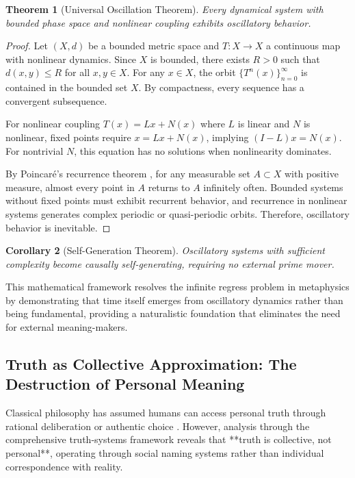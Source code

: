 \documentclass[12pt,a4paper]{article}
\newtheorem{theorem}{Theorem}[section]
\newtheorem{corollary}[theorem]{Corollary}
\begin{document}
\begin{theorem}[Universal Oscillation Theorem]
Every dynamical system with bounded phase space and nonlinear coupling exhibits oscillatory behavior.
\end{theorem}

\begin{proof}
Let $(X, d)$ be a bounded metric space and $T: X \to X$ a continuous map with nonlinear dynamics. Since $X$ is bounded, there exists $R > 0$ such that $d(x,y) \leq R$ for all $x,y \in X$. For any $x \in X$, the orbit $\{T^n(x)\}_{n=0}^{\infty}$ is contained in the bounded set $X$. By compactness, every sequence has a convergent subsequence.

For nonlinear coupling $T(x) = Lx + N(x)$ where $L$ is linear and $N$ is nonlinear, fixed points require $x = Lx + N(x)$, implying $(I-L)x = N(x)$. For nontrivial $N$, this equation has no solutions when nonlinearity dominates.

By Poincaré's recurrence theorem \citep{poincare1890probleme}, for any measurable set $A \subset X$ with positive measure, almost every point in $A$ returns to $A$ infinitely often. Bounded systems without fixed points must exhibit recurrent behavior, and recurrence in nonlinear systems generates complex periodic or quasi-periodic orbits. Therefore, oscillatory behavior is inevitable.
\end{proof}

\begin{corollary}[Self-Generation Theorem]
Oscillatory systems with sufficient complexity become causally self-generating, requiring no external prime mover.
\end{corollary}

This mathematical framework resolves the infinite regress problem in metaphysics by demonstrating that time itself emerges from oscillatory dynamics rather than being fundamental, providing a naturalistic foundation that eliminates the need for external meaning-makers.

\subsection{Truth as Collective Approximation: The Destruction of Personal Meaning}

Classical philosophy has assumed humans can access personal truth through rational deliberation \citep{kant1998critique} or authentic choice \citep{sartre2007existentialism}. However, analysis through the comprehensive truth-systems framework \citep{sachikonye2025truth} reveals that **truth is collective, not personal**, operating through social naming systems rather than individual correspondence with reality.
\end{document}
